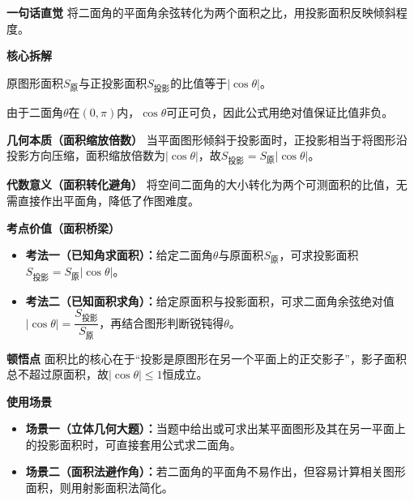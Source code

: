\begin{explanationbox}
	\textbf{\textcolor{CExplanation}{一句话直觉}}
	将二面角的平面角余弦转化为两个面积之比，用投影面积反映倾斜程度。

	\medskip
	\textbf{\textcolor{CExplanation}{核心拆解}}
	\begin{description}[style=nextline,leftmargin=2.8em,labelsep=0.5em,itemsep=0.45em]
		\item[\textbf{要点一（面积比关系）：}]
			原图形面积$S_{\text{原}}$与正投影面积$S_{\text{投影}}$的比值等于$|\cos\theta|$。
		\item[\textbf{要点二（余弦绝对值）：}]
			由于二面角$\theta$在$(0,\pi)$内，$\cos\theta$可正可负，因此公式用绝对值保证比值非负。
	\end{description}

	\medskip
	\textbf{\textcolor{CExplanation}{几何本质（面积缩放倍数）}}
	当平面图形倾斜于投影面时，正投影相当于将图形沿投影方向压缩，面积缩放倍数为$|\cos\theta|$，故$S_{\text{投影}}=S_{\text{原}}|\cos\theta|$。

	\medskip
	\textbf{\textcolor{CExplanation}{代数意义（面积转化避角）}}
	将空间二面角的大小转化为两个可测面积的比值，无需直接作出平面角，降低了作图难度。

	\medskip
	\textbf{\textcolor{CExplanation}{考点价值（面积桥梁）}}
	\begin{itemize}[leftmargin=*,itemsep=0.5em,topsep=0.4em]
		\item\textbf{考法一（已知角求面积）：}给定二面角$\theta$与原面积$S_{\text{原}}$，可求投影面积$S_{\text{投影}}=S_{\text{原}}|\cos\theta|$。\item\textbf{考法二（已知面积求角）：}给定原面积与投影面积，可求二面角余弦绝对值$|\cos\theta|=\dfrac{S_{\text{投影}}}{S_{\text{原}}}$，再结合图形判断锐钝得$\theta$。
	\end{itemize}

	\medskip
	\textbf{\textcolor{CExplanation}{顿悟点}}
	面积比的核心在于“投影是原图形在另一个平面上的正交影子”，影子面积总不超过原面积，故$|\cos\theta|\le1$恒成立。

	\medskip
	\textbf{\textcolor{CExplanation}{使用场景}}
	\begin{itemize}[leftmargin=*,itemsep=0.5em,topsep=0.4em]
		\item\textbf{场景一（立体几何大题）：}当题中给出或可求出某平面图形及其在另一平面上的投影面积时，可直接套用公式求二面角。\item\textbf{场景二（面积法避作角）：}若二面角的平面角不易作出，但容易计算相关图形面积，则用射影面积法简化。
	\end{itemize}

\end{explanationbox}
